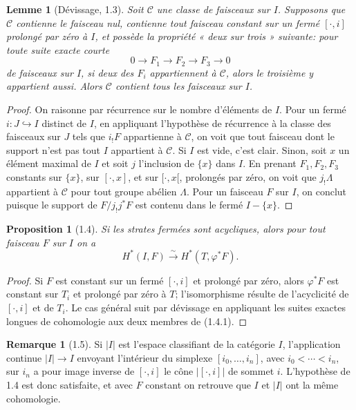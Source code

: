 \documentclass[11pt]{article}
\newtheorem{proposition}[theorem]{Proposition}
\newtheorem{lemma}[theorem]{Lemme}
\theoremstyle{definition}
\newtheorem{remark}[theorem]{Remarque}
\begin{document}
\begin{lemma}[Dévissage, 1.3]
Soit $\mathcal C$ une classe de faisceaux sur $I$. Supposons que $\mathcal C$ contienne le faisceau nul, contienne tout faisceau constant sur un fermé $[\cdot,i]$ prolongé par zéro à $I$, et possède la propriété « deux sur trois » suivante: pour toute suite exacte courte
\[
0\to F_1\to F_2\to F_3\to0
\]
de faisceaux sur $I$, si deux des $F_i$ appartiennent à $\mathcal C$, alors le troisième y appartient aussi. Alors $\mathcal C$ contient tous les faisceaux sur $I$.
\end{lemma}
\begin{proof}
On raisonne par récurrence sur le nombre d'éléments de $I$. Pour un fermé $i:J\hookrightarrow I$ distinct de $I$, en appliquant l'hypothèse de récurrence à la classe des faisceaux sur $J$ tels que $i_!F$ appartienne à $\mathcal C$, on voit que tout faisceau dont le support n'est pas tout $I$ appartient à $\mathcal C$. Si $I$ est vide, c'est clair. Sinon, soit $x$ un élément maximal de $I$ et soit $j$ l'inclusion de $\{x\}$ dans $I$. En prenant $F_1,F_2,F_3$ constants sur $\{x\}$, sur $[\cdot,x]$, et sur $[\cdot,x[$, prolongés par zéro, on voit que $j_!\Lambda$ appartient à $\mathcal C$ pour tout groupe abélien $\Lambda$. Pour un faisceau $F$ sur $I$, on conclut puisque le support de $F/j_!j^*F$ est contenu dans le fermé $I-\{x\}$.
\end{proof}

\begin{proposition}[1.4]
Si les strates fermées sont acycliques, alors pour tout faisceau $F$ sur $I$ on a
\begin{equation}
H^*(I,F)\xrightarrow{\sim}H^*(T,\varphi^*F).\tag{1.4.1}
\end{equation}
\end{proposition}
\begin{proof}
Si $F$ est constant sur un fermé $[\cdot,i]$ et prolongé par zéro, alors $\varphi^*F$ est constant sur $T_i$ et prolongé par zéro à $T$; l'isomorphisme résulte de l'acyclicité de $[\cdot,i]$ et de $T_i$. Le cas général suit par dévissage en appliquant les suites exactes longues de cohomologie aux deux membres de (1.4.1).
\end{proof}

\begin{remark}[1.5]
Si $|I|$ est l'espace classifiant de la catégorie $I$, l'application continue $|I|\to I$ envoyant l'intérieur du simplexe $[i_0,\ldots,i_n]$, avec $i_0<\cdots<i_n$, sur $i_n$ a pour image inverse de $[\cdot,i]$ le cône $|[\cdot,i]|$ de sommet $i$. L'hypothèse de 1.4 est donc satisfaite, et avec $F$ constant on retrouve que $I$ et $|I|$ ont la même cohomologie.
\end{remark}
\end{document}
